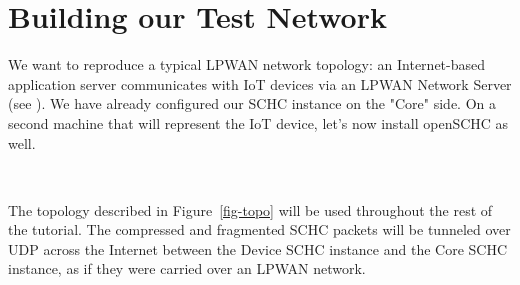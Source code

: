 \section{Building our Test Network}\label{chap-TestNetTopo}

We want to reproduce a typical LPWAN network topology: an Internet-based application server communicates with IoT devices via an LPWAN Network Server (see ).
We have already configured our SCHC instance on the "Core" side. On a second machine that will represent the IoT device, let's now install openSCHC as well.

~

The topology described in Figure~\ref{fig-topo} will be used throughout the rest of the tutorial. The compressed and fragmented SCHC packets will be tunneled over UDP across the Internet between the Device SCHC instance and the Core SCHC instance, as if they were carried over an LPWAN network.

